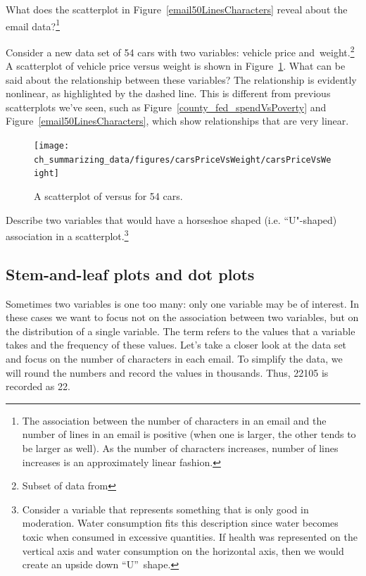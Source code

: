 \begin{exercise}
What does the scatterplot in Figure~\ref{email50LinesCharacters} reveal about the email data?\footnote{The association between the number of characters in an email and the number of lines in an email is positive (when one is larger, the other tends to be larger as well). As the number of characters increases, number of lines increases is an approximately linear fashion.}
\end{exercise}

\begin{example}{Consider a new data set of 54 cars with two variables: vehicle price and~weight.\footnote{Subset of data from } A scatterplot of vehicle price versus weight is shown in Figure~\ref{carsPriceVsWeight}. What can be said about the relationship between these variables?}
The relationship is evidently nonlinear, as highlighted by the dashed line. This is different from previous scatterplots we've seen, such as Figure~\vref{county_fed_spendVsPoverty} and Figure~\ref{email50LinesCharacters}, which show relationships that are very linear.

\begin{figure}[h]
   \centering
   \texttt{[image: ch\_summarizing\_data/figures/carsPriceVsWeight/carsPriceVsWeight]}
   \caption{A scatterplot of  versus  for 54 cars.}
   \label{carsPriceVsWeight}
\end{figure}
\end{example}

\begin{exercise}
Describe two variables that would have a horseshoe shaped (i.e. ``U"-shaped) association in a scatterplot.\footnote{Consider a variable that represents something that is only good in moderation. Water consumption fits this description since water becomes toxic when consumed in excessive quantities. If health was represented on the vertical axis and water consumption on the horizontal axis, then we would create an upside down ``U''~shape.}
\end{exercise}


\subsection{Stem-and-leaf plots and dot plots}
\label{dotPlot}

Sometimes two variables is one too many: only one variable may be of interest. In these cases we want to focus not on the association between two variables, but on the distribution of a single variable. The term  refers to the values that a variable takes and the frequency of these values. Let's take a closer look at the  data set and focus on the number of characters in each email. To simplify the data, we will round the numbers and record the values in thousands. Thus, 22105 is recorded as 22.

